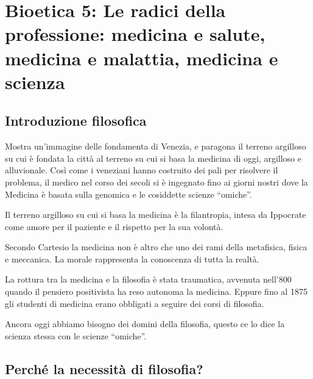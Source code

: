 \section{Bioetica 5: Le radici della professione: medicina e salute, medicina e malattia, medicina e scienza}

\subsection{Introduzione filosofica}

Mostra un'immagine delle fondamenta di Venezia, e paragona il terreno
argilloso su cui è fondata la città al terreno su cui si basa la
medicina di oggi, argilloso e alluvionale. Così come i veneziani hanno
costruito dei pali per risolvere il problema, il medico nel corso dei
secoli si è ingegnato fino ai giorni nostri dove la Medicina è basata
sulla genomica e le cosiddette scienze ``omiche''.

Il terreno argilloso su cui si basa la medicina è la filantropia, intesa
da Ippocrate come amore per il paziente e il rispetto per la sua
volontà.

Secondo Cartesio la medicina non è altro che uno dei rami della
metafisica, fisica e meccanica. La morale rappresenta la conoscenza di
tutta la realtà.

La rottura tra la medicina e la filosofia è stata traumatica, avvenuta
nell'800 quando il pensiero positivista ha reso autonoma la medicina.
Eppure fino al 1875 gli studenti di medicina erano obbligati a seguire
dei corsi di filosofia.

Ancora oggi abbiamo bisogno dei domini della filosofia, questo ce lo
dice la scienza stessa con le scienze ``omiche''.

\subsection{Perché la necessità di filosofia?}

